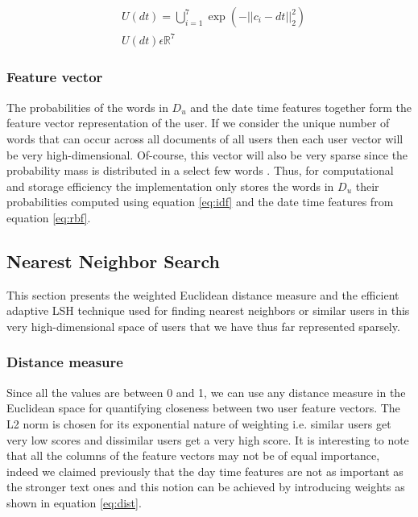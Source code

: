\documentclass{article}
\begin{document}
\begin{center}
\begin{align}
\label{eq:rbf}
&U(dt) = \bigcup_{i=1}^{7}\exp(-{||c_{i}-dt||}_2^2) \\
&U(dt) \epsilon \mathbb{R}^7
\end{align}
\end{center}


\subsubsection{Feature vector}

The probabilities of the words in $D_u$ and the date time features
together form the feature vector representation of the user. If we consider the
unique number of words that can occur across all documents of all users then
each user vector will be very high-dimensional. Of-course, this vector will also
be very sparse since the probability mass is distributed in a select few words
. Thus, for computational and storage
efficiency the implementation only stores the words in $D_u$ their probabilities
computed using equation \ref{eq:idf} and the date time features from equation 
\ref{eq:rbf}. 

\subsection{Nearest Neighbor Search}

This section presents the weighted Euclidean distance measure and the 
efficient adaptive LSH technique used for finding nearest neighbors or
similar users in this very high-dimensional space of users that we have thus
far represented sparsely.

\subsubsection{Distance measure}

Since all the values are between 0 and 1, we can use any distance measure in the Euclidean
space for quantifying closeness between two user feature vectors.
The L2 norm is chosen for its exponential nature of weighting i.e. similar users
get very low scores and dissimilar users get a very high score. It is interesting
to note that all the columns of the feature vectors may not be of equal importance, indeed
we claimed previously that the day time features are not as important as the stronger
text ones and this notion can be achieved by introducing weights as shown in
equation \ref{eq:dist}.
\end{document}
